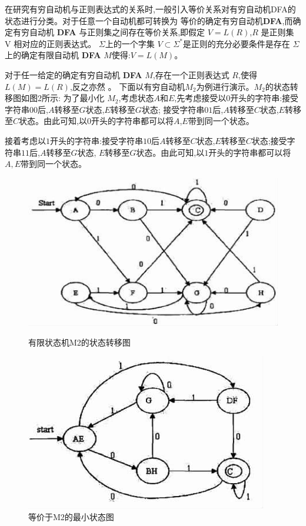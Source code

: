 \documentclass[UTF8]{ctexart}
\begin{document}
	在研究有穷自动机与正则表达式的关系时,一般引入等价关系对有穷自动机DFA的状态进行分类。对于任意一个自动机都可转换为
	等价的确定有穷自动机\textbf{DFA},而确定有穷自动机 \textbf{DFA} 与正则集之间存在等价关系,即假定 $V=L(R)$,$R$ 是正则集 V 相对应的正则表达式。
	$\Sigma$上的一个字集 $V \subset \Sigma^{*}$是正则的充分必要条件是存在 $\Sigma $上的确定有限自动机 \textbf{DFA} $M$使得:$V=L(M)$。 
	
	
	对于任一给定的确定有穷自动机 \textbf{DFA} $M$,存在一个正则表达式 $R$,使得 $L(M)=L(R)$,反之亦然 。
	下面以有穷自动机$M_2$为例进行演示。$M_2$的状态转移图如图2所示:
	为了最小化 $M_2$,考虑状态$A$和$E$,先考虑接受以$0$开头的字符串:接受字符串$00$后,$A$转移至$G$状态,$E$转移至$G$状态;
	接受字符串$01$后,$A$转移至$C$状态,$E$转移至$C$状态。由此可知,以$0$开头的字符串都可以将$A$,$E$带到同一个状态。
	
	接着考虑以$1$开头的字符串:接受字符串$10$后$A$转移至$C$状态,$E$转移至$C$状态;接受字符串$11$后,$A$转移至$G$状态,
	$E$转移至$G$状态。由此可知,以$1$开头的字符串都可以将$A,E$带到同一个状态。
	
	
	\begin{figure}[htbp]
		\centering
		\begin{minipage}{0.45\textwidth}
			\centering
			\includegraphics[width=\textwidth]{../Img/4_2_pic1.png}
			\caption{有限状态机M2的状态转移图}
		\end{minipage}
		\hfill
		\begin{minipage}{0.45\textwidth}
			\centering
			\includegraphics[width=\textwidth]{../Img/4_2_pic2.png}
			\caption{等价于M2的最小状态图}
		\end{minipage}
	\end{figure}
	
\end{document}
